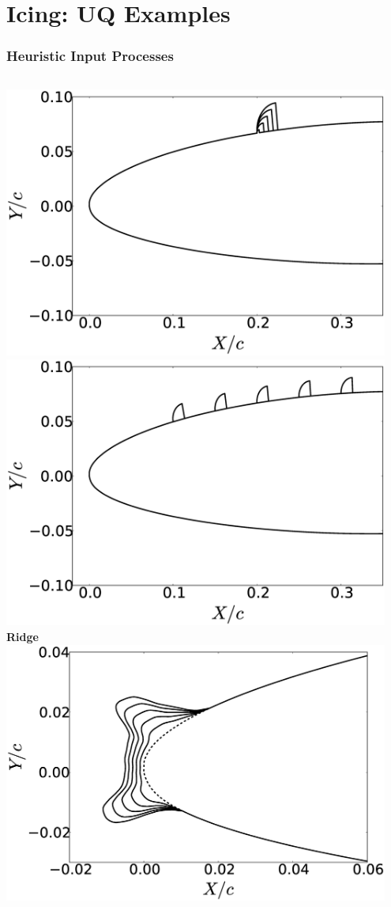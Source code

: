 \documentclass[9pt]{beamer}
\begin{document}
\section{Icing: UQ Examples}
\label{sec-2}
\begin{frame}
\frametitle{Heuristic Input Processes}
\label{sec-2-1}


\begin{columns}[c]
    \centering
    \includegraphics[width=0.95\textwidth]{RidgeRVariation} \\
    \includegraphics[width=0.95\textwidth]{RidgeSVariation} \\
    {\bf Ridge}
    \centering
    \includegraphics[width=0.95\textwidth]{HornHVariation} \\

\end{columns}
\end{frame}
\end{document}

